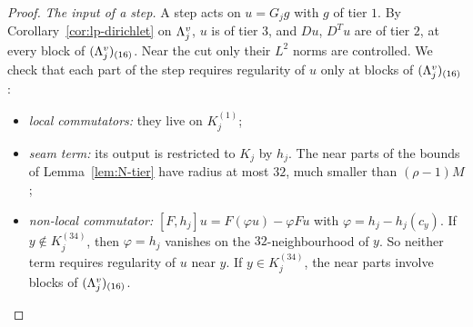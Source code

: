 \begin{proof}
\emph{The input of a step.} A step acts on $u=G_jg$ with $g$ of tier $1$. By Corollary~\ref{cor:lp-dirichlet} on $\Lambda^v_j$, $u$ is of tier $3$, and $Du$, $D^Tu$ are of tier $2$, at every block of $(\Lambda^v_j)_{(16)}$. Near the cut only their $L^2$ norms are controlled. We check that each part of the step requires regularity of $u$ only at blocks of $(\Lambda^v_j)_{(16)}$:
\begin{itemize}
\item \emph{local commutators:} they live on $K_j^{(1)}$;
\item \emph{seam term:} its output is restricted to $K_j$ by $h_j$. The near parts of the bounds of Lemma~\ref{lem:N-tier} have radius at most $32$, much smaller than $(\rho-1)M$;
\item \emph{non-local commutator:} $[F,h_j]u=F(\varphi u)-\varphi Fu$ with $\varphi=h_j-h_j(c_y)$. If $y\notin K_j^{(34)}$, then $\varphi=h_j$ vanishes on the $32$-neighbourhood of $y$. So neither term requires regularity of $u$ near $y$. If $y\in K_j^{(34)}$, the near parts involve blocks of $(\Lambda^v_j)_{(16)}$.
\end{itemize}


\end{proof}

